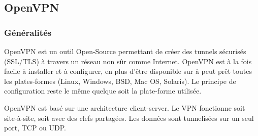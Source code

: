 \subsection{OpenVPN}

\subsubsection{Généralités}
OpenVPN est un outil Open-Source permettant de créer des tunnels sécurisés (SSL/TLS) à travers un réseau non sûr comme Internet. OpenVPN est à la fois facile à installer et à configurer, en plus d'être disponible sur à peut prêt toutes les plates-formes (Linux, Windows, BSD, Mac OS, Solaris). Le principe de configuration reste le même quelque soit la plate-forme utilisée.

OpenVPN est basé sur une architecture client-server. Le VPN fonctionne soit site-à-site, soit avec des clefs partagées. Les données sont tunnelisées sur un seul port, TCP ou UDP.
% 
% 
% 
% 
% 
